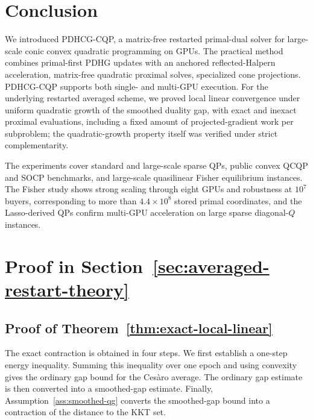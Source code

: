 \documentclass[letterpaper]{article} %
\newcommand{\name}{PDHCG-CQP\xspace}
\theoremstyle{definition}
\theoremstyle{remark}
\begin{document}
\section{Conclusion}
\label{sec:conclusion}

We introduced \name, a matrix-free restarted primal-dual solver for
large-scale conic convex quadratic programming on GPUs.  The practical
method combines primal-first PDHG updates with an anchored reflected-Halpern
acceleration, matrix-free quadratic proximal solves, specialized cone
projections. \name supports both single- and multi-GPU execution.
For the underlying restarted averaged scheme, we proved local linear
convergence under uniform quadratic growth of the smoothed duality gap, with
exact and inexact proximal evaluations, including a fixed amount of
projected-gradient work per subproblem; the quadratic-growth property itself
was verified under strict complementarity.

The experiments cover standard and large-scale sparse QPs, public convex
QCQP and SOCP benchmarks, and large-scale quasilinear Fisher equilibrium
instances. The Fisher study shows strong scaling through eight GPUs and
robustness at $10^7$ buyers, corresponding to more than $4.4\times10^8$
stored primal coordinates, and the Lasso-derived QPs confirm multi-GPU
acceleration on large sparse diagonal-$Q$ instances.







\clearpage
\appendix

\section{Proof in Section~\ref{sec:averaged-restart-theory}}

\subsection{Proof of Theorem~\ref{thm:exact-local-linear}}
\label{app:proof-exact-local-linear}

The exact contraction is obtained in four steps.  We first establish a
one-step energy inequality.  Summing this inequality over one epoch and using
convexity gives the ordinary gap bound for the Ces\`aro average.  The ordinary
gap estimate is then converted into a smoothed-gap estimate.  Finally,
Assumption~\ref{ass:smoothed-qg} converts the smoothed-gap bound into a
contraction of the distance to the KKT set.
\end{document}
